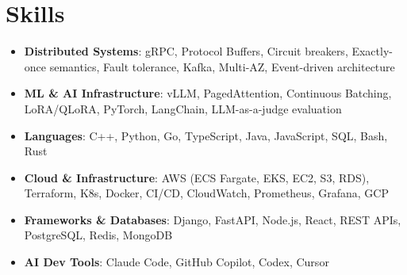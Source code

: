 \documentclass[letterpaper,11pt]{article}
\newcommand{\resumeSubHeadingListStart}{\begin{itemize}[leftmargin=0.15in, label={}]}
\newcommand{\resumeSubHeadingListEnd}{\end{itemize}}
\newcommand{\resumeSkillHeading}[2]{%
  \item\small{\textbf{#1}: #2 \vspace{-9pt}}%
}
\begin{document}
\section{Skills}
  \resumeSubHeadingListStart
    \resumeSkillHeading{Distributed Systems}{gRPC, Protocol Buffers, Circuit breakers, Exactly-once semantics, Fault tolerance, Kafka, Multi-AZ, Event-driven architecture}
    \resumeSkillHeading{ML \& AI Infrastructure}{vLLM, PagedAttention, Continuous Batching, LoRA/QLoRA, PyTorch, LangChain, LLM-as-a-judge evaluation}
    \resumeSkillHeading{Languages}{C++, Python, Go, TypeScript, Java, JavaScript, SQL, Bash, Rust}
    \resumeSkillHeading{Cloud \& Infrastructure}{AWS (ECS Fargate, EKS, EC2, S3, RDS), Terraform, K8s, Docker, CI/CD, CloudWatch, Prometheus, Grafana, GCP}
    \resumeSkillHeading{Frameworks \& Databases}{Django, FastAPI, Node.js, React, REST APIs, PostgreSQL, Redis, MongoDB}
    \resumeSkillHeading{AI Dev Tools}{Claude Code, GitHub Copilot, Codex, Cursor}
  \resumeSubHeadingListEnd
\end{document}
